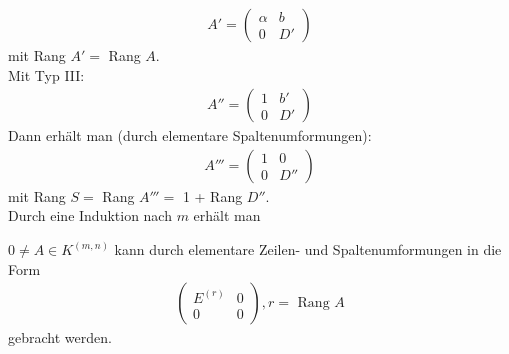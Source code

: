 \documentclass[11pt]{report}
\begin{document}
\begin{align}
A' = \begin{pmatrix} \alpha & b \\ 0 & D' \end{pmatrix}
\end{align}
mit Rang $A' = $ Rang $A$.\\
Mit Typ III:
\begin{align}
A'' = \begin{pmatrix} 1 & b' \\ 0 & D' \end{pmatrix}
\end{align}
Dann erhält man (durch elementare Spaltenumformungen):
\begin{align}
A''' = \begin{pmatrix} 1 & 0 \\ 0 & D'' \end{pmatrix} 
\end{align}
mit Rang $S =$ Rang $A''' = $ 1 + Rang $D''$. \\
Durch eine Induktion nach $m$ erhält man \\
\begin{satz}
\label{satz537}
$0 \neq A \in K^{(m,n)}$ kann durch elementare Zeilen- und Spaltenumformungen in die Form
\begin{align}
\begin{pmatrix} E^{(r)} & 0 \\ 0 & 0\end{pmatrix}, r = \text{ Rang } A
\end{align}
gebracht werden.
\end{satz}
\end{document}
